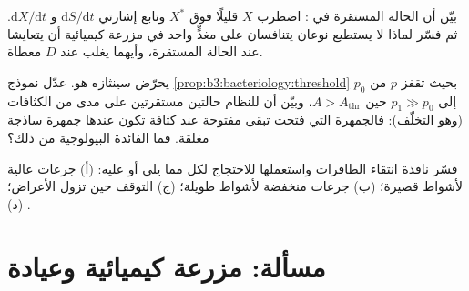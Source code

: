 \begin{exercise}[$\star\star\star$]\label{exo:b3:bacteriology:10}
بيّن أن الحالة المستقرة في : اضطرب $X$ قليلًا
فوق $X^{*}$ وتابع إشارتي $\mathrm{d}S/\mathrm{d}t$ و
$\mathrm{d}X/\mathrm{d}t$. ثم فسّر لماذا لا يستطيع نوعان يتنافسان على
مغذٍّ واحد في مزرعة كيميائية أن يتعايشا عند الحالة المستقرة، وأيهما
يغلب عند $D$ معطاة.
\end{exercise}

\begin{exercise}[$\star\star\star$]\label{exo:b3:bacteriology:11}
 يحرّض سينثازه هو. عدّل نموذج
\cref{prop:b3:bacteriology:threshold} بحيث تقفز $p$ من $p_{0}$ إلى
$p_{1} \gg p_{0}$ حين $A > A_{\text{thr}}$، وبيّن أن للنظام
حالتين مستقرتين على مدى من الكثافات (وهو التخلّف):
فالجمهرة التي فتحت تبقى مفتوحة عند كثافة تكون عندها جمهرة ساذجة
مغلقة. فما الفائدة البيولوجية من ذلك؟
\end{exercise}

\begin{exercise}[$\star\star\star$]\label{exo:b3:bacteriology:12}
فسّر نافذة انتقاء الطافرات واستعملها للاحتجاج لكل مما يلي أو عليه:
(أ) جرعات عالية لأشواط قصيرة؛ (ب) جرعات منخفضة لأشواط
طويلة؛ (ج) التوقف حين تزول الأعراض؛ (د) .
\end{exercise}

\section{مسألة: مزرعة كيميائية وعيادة}

